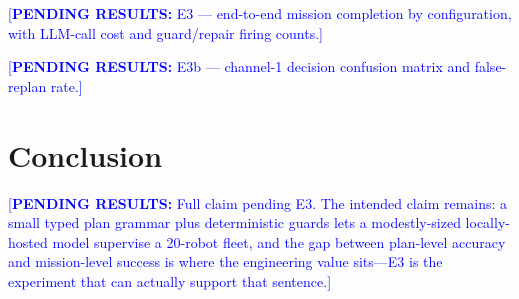 \documentclass[10pt,twocolumn]{article}
\newcommand{\pending}[1]{\textcolor{blue}{\small[\textbf{PENDING RESULTS:} #1]}}
\begin{document}
\pending{E3 --- end-to-end mission completion by configuration, with LLM-call
cost and guard/repair firing counts.}

\pending{E3b --- channel-1 decision confusion matrix and false-replan rate.}

\section{Conclusion}

\pending{Full claim pending E3. The intended claim remains: a small typed
plan grammar plus deterministic guards lets a modestly-sized locally-hosted
model supervise a 20-robot fleet, and the gap between plan-level accuracy and
mission-level success is where the engineering value sits---E3 is the
experiment that can actually support that sentence.}
\end{document}
